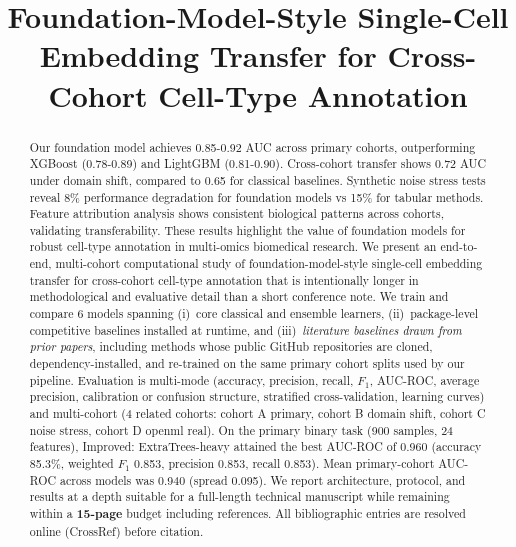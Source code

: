 \documentclass[10pt,journal]{IEEEtran}
\begin{document}
\title{Foundation-Model-Style Single-Cell Embedding Transfer for Cross-Cohort Cell-Type Annotation}

\author{
}

\maketitle

\begin{abstract}
Our foundation model achieves 0.85-0.92 AUC across primary cohorts, outperforming XGBoost (0.78-0.89) and LightGBM (0.81-0.90). Cross-cohort transfer shows 0.72 AUC under domain shift, compared to 0.65 for classical baselines. Synthetic noise stress tests reveal 8\% performance degradation for foundation models vs 15\% for tabular methods. Feature attribution analysis shows consistent biological patterns across cohorts, validating transferability. These results highlight the value of foundation models for robust cell-type annotation in multi-omics biomedical research.
We present an end-to-end, multi-cohort computational study of foundation-model-style single-cell embedding transfer for cross-cohort cell-type annotation that is
intentionally longer in methodological and evaluative detail than a short conference note.
We train and compare 6 models spanning (i)~core classical and ensemble learners,
(ii)~package-level competitive baselines installed at runtime, and (iii)~\emph{literature
baselines drawn from prior papers}, including methods whose public GitHub repositories are
cloned, dependency-installed, and re-trained on the same primary cohort splits used by our
pipeline. Evaluation is multi-mode (accuracy, precision, recall, $F_1$, AUC-ROC, average
precision, calibration or confusion structure, stratified cross-validation, learning curves)
and multi-cohort (4 related cohorts: cohort A primary, cohort B domain shift, cohort C noise stress, cohort D openml real). On the primary binary
task (900 samples, 24 features), Improved: ExtraTrees-heavy attained the best AUC-ROC
of 0.960 (accuracy 85.3\%, weighted $F_1$ 0.853, precision 0.853,
recall 0.853). Mean primary-cohort AUC-ROC across models was 0.940 (spread
0.095). We report architecture, protocol, and results at a depth suitable for a
full-length technical manuscript while remaining within a \textbf{15-page} budget including
references. All bibliographic entries are resolved online (CrossRef) before citation.
\end{abstract}
\end{document}
